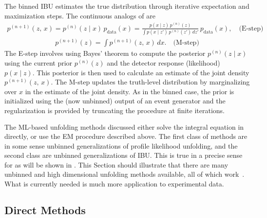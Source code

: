 The binned IBU estimates the true distribution through iterative expectation and maximization steps.
The continuous analogs of  are
\begin{align}
\label{eq:ibu-continuous-estep}
p^{(n+1)}(z, \, x) = p^{(n)}(z \mid x)\, p_{\mathrm{data}}(x) = \frac{p(x \mid z)\, p^{(n)}(z)}{\int p(x \mid z')\, p^{(n)}(z')\, dz'}\, p_{\mathrm{data}}(x), \quad \text{(E-step)}
\end{align}
\begin{align}
\label{eq:ibu-continuous-mstep}
p^{(n+1)}(z) = \int p^{(n+1)}(z, \, x) \, dx. \quad \text{(M-step)}
\end{align}
The E-step involves using Bayes' theorem to compute the posterior $p^{(n)}(z \mid x)$ using the current prior $p^{(n)}(z)$ and the detector response (likelihood) $p(x \mid z)$.
This posterior is then used to calculate an estimate of the joint density $p^{(n+1)}(z, \, x)$.
The M-step updates the truth-level distribution by marginalizing over $x$ in the estimate of the joint density.
As in the binned case, the prior is initialized using the (now unbinned) output of an event generator and the regularization is provided by truncating the procedure at finite iterations.

The ML-based unfolding methods discussed either solve the integral equation in  directly, or use the EM procedure described above.
The first class of methods are in some sense unbinned generalizations of profile likelihood unfolding, and the second class are unbinned generalizations of IBU.
This is true in a precise sense for \Omnifold as will be shown in .
This Section should illustrate that there are many unbinned and high dimensional unfolding methods available, all of which work~\cite{Huetsch:2024quz}.
What is currently needed is much more application to experimental data.

\subsection{Direct Methods}
\label{sec:direct-unfolding-methods}

